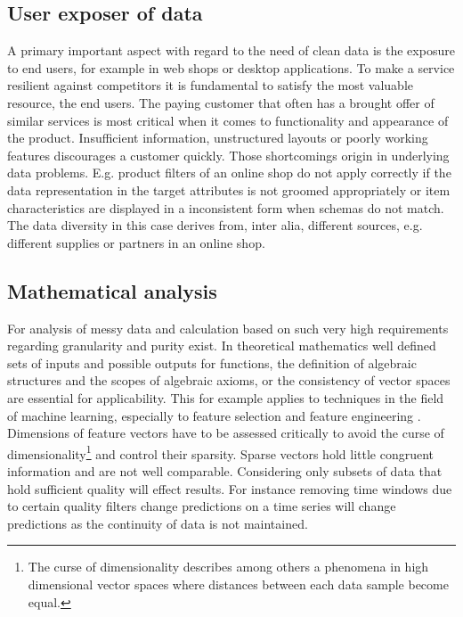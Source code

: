 \subsection{User exposer of data}

A primary important aspect with regard to the need of clean data is the exposure to end users, for example in web shops or desktop applications.
To make a service resilient against competitors it is fundamental to satisfy the most valuable resource, the end users. The paying customer that often has a brought offer of similar services is most critical when it comes to functionality and appearance of the product.
Insufficient information, unstructured layouts or poorly working features discourages a customer quickly. Those shortcomings origin in underlying data problems. E.g. product filters of an online shop do not apply correctly if the data representation in the target attributes is not groomed appropriately or item characteristics are displayed in a inconsistent form when schemas do not match. The data diversity in this case derives from, inter alia, different sources, e.g. different supplies or partners in an online shop.

\subsection{Mathematical analysis} 

For analysis of messy data and calculation based on such 
very high requirements regarding granularity and purity exist. In theoretical mathematics well defined sets of inputs and possible outputs for functions, the definition of algebraic structures and the scopes of algebraic axioms, or the consistency of vector spaces are essential for applicability. This for example applies to techniques in the field of machine learning, especially to feature selection and feature engineering
. Dimensions of feature vectors have to be assessed critically to avoid the curse of dimensionality\footnote{The curse of dimensionality describes among others a phenomena in high dimensional vector spaces where distances between each data sample become equal.} and control their sparsity. Sparse vectors hold little congruent information and are not well comparable. Considering only subsets of data that hold sufficient quality will effect results. For instance removing time windows due to certain quality filters change predictions on a time series will change predictions as the continuity of data is not maintained.

